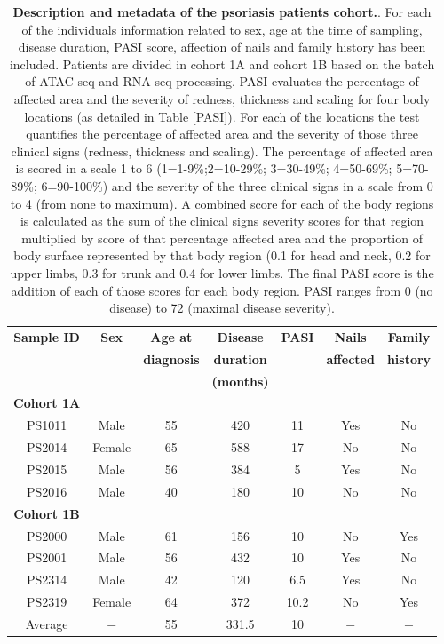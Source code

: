 		
\begin{table}[htbp]
\centering
\begin{tabular}{@{} c c c c c c c}
\toprule
\textbf{ Sample ID} & \textbf{Sex} & \textbf{Age at}    & \textbf{Disease}  & \textbf{PASI}  &\textbf{Nails}      & \textbf{Family} \\
                    &              & \textbf{diagnosis} & \textbf{duration} &                & \textbf{affected}  & \textbf{history} \\
										&							 &										&	\textbf{(months)}	&								 &                    &                  \\
\midrule
\midrule
\textbf{Cohort 1A} & & & & & & \\
\midrule
PS1011	& Male	 & 55 & 420 & 11	 & Yes	 & No \\
PS2014	& Female & 65	& 588	& 17	 & No	   & No \\
PS2015	& Male	 & 56	& 384	& 5	   & Yes   & No \\
PS2016	& Male	 & 40	& 180	& 10	 & No    & No \\
\midrule
\midrule
\textbf{Cohort 1B} & & & & & & \\
\midrule
PS2000	& Male	 & 61	& 156	& 10	 & No	   & Yes \\
PS2001	& Male	 & 56	& 432	& 10	 & Yes	 & No \\
PS2314	& Male	 & 42	& 120	& 6.5	 & Yes   & No \\
PS2319	& Female & 64	& 372	& 10.2 & No    & Yes \\
\midrule
Average		& $-$	 & 55 & 331.5 & 10 & $-$   & $-$ \\																			
\bottomrule
\end{tabular}
\medskip %
\caption[Description and metadata of the psoriasis patients cohort.]{\textbf{Description and metadata of the psoriasis patients cohort.}. For each of the individuals information related to sex, age at the time of sampling, disease duration, PASI score, affection of nails and family history has been included. Patients are divided in cohort 1A and cohort 1B based on the batch of ATAC-seq and RNA-seq processing. PASI evaluates the percentage of affected area and the severity of redness, thickness and scaling for four body locations (as detailed in Table \ref{PASI}). For each of the locations the test quantifies the percentage of affected area and the severity of those three clinical signs (redness, thickness and scaling). The percentage of affected area is scored in a scale 1 to 6 (1=1-9\%;2=10-29\%; 3=30-49\%; 4=50-69\%; 5=70-89\%; 6=90-100\%) and the severity of the three clinical signs in a scale from 0 to 4 (from none to maximum). A combined score for each of the body regions is calculated as the sum of the clinical signs severity scores for that region multiplied by score of that percentage affected area and the proportion of body surface represented by that body region (0.1 for head and neck, 0.2 for upper limbs, 0.3 for trunk and 0.4 for lower limbs. The final PASI score is the addition of each of those scores for each body region. PASI ranges from 0 (no disease) to 72 (maximal disease severity).} 
\label{tab:Psoriasis_cohort_metadata}
\end{table}
